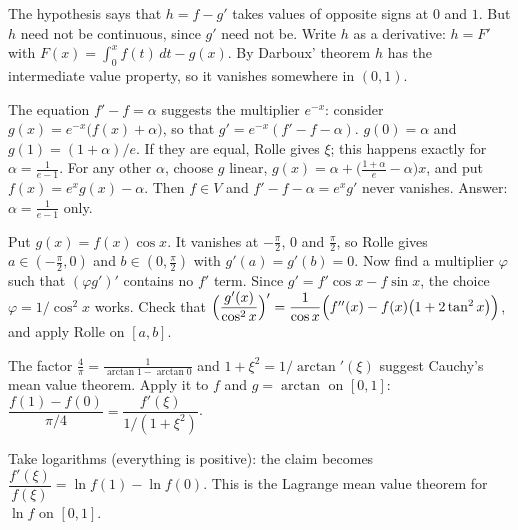 \documentclass[11pt,a4paper]{article}
\begin{document}

 The hypothesis says that $h=f-g'$ takes values of opposite signs at $0$ and $1$. But $h$ need not be continuous, since $g'$ need not be.
 Write $h$ as a derivative: $h=F'$ with $F(x)=\int_0^x f(t)\,dt-g(x)$. By Darboux' theorem $h$ has the intermediate value property, so it vanishes somewhere in $(0,1)$.

 The equation $f'-f=\alpha$ suggests the multiplier $e^{-x}$: consider $g(x)=e^{-x}\bigl(f(x)+\alpha\bigr)$, so that $g'=e^{-x}(f'-f-\alpha)$.
 $g(0)=\alpha$ and $g(1)=(1+\alpha)/e$. If they are equal, Rolle gives $\xi$; this happens exactly for $\alpha=\frac1{e-1}$.
 For any other $\alpha$, choose $g$ linear, $g(x)=\alpha+\bigl(\frac{1+\alpha}{e}-\alpha\bigr)x$, and put $f(x)=e^xg(x)-\alpha$. Then $f\in V$ and $f'-f-\alpha=e^xg'$ never vanishes. Answer: $\alpha=\frac1{e-1}$ only.

 Put $g(x)=f(x)\cos x$. It vanishes at $-\frac\pi2$, $0$ and $\frac\pi2$, so Rolle gives $a\in(-\frac\pi2,0)$ and $b\in(0,\frac\pi2)$ with $g'(a)=g'(b)=0$.
 Now find a multiplier $\varphi$ such that $(\varphi g')'$ contains no $f'$ term. Since $g'=f'\cos x-f\sin x$, the choice $\varphi=1/\cos^2x$ works.
 Check that $\Bigl(\dfrac{g'(x)}{\cos^2x}\Bigr)'=\dfrac{1}{\cos x}\Bigl(f''(x)-f(x)\bigl(1+2\tan^2x\bigr)\Bigr)$, and apply Rolle on $[a,b]$.

 The factor $\frac4\pi=\frac{1}{\arctan1-\arctan0}$ and $1+\xi^2=1/\arctan'(\xi)$ suggest Cauchy's mean value theorem.
 Apply it to $f$ and $g=\arctan$ on $[0,1]$: $\dfrac{f(1)-f(0)}{\pi/4}=\dfrac{f'(\xi)}{1/(1+\xi^2)}$.

 Take logarithms (everything is positive): the claim becomes $\dfrac{f'(\xi)}{f(\xi)}=\ln f(1)-\ln f(0)$.
 This is the Lagrange mean value theorem for $\ln f$ on $[0,1]$.
\end{document}
